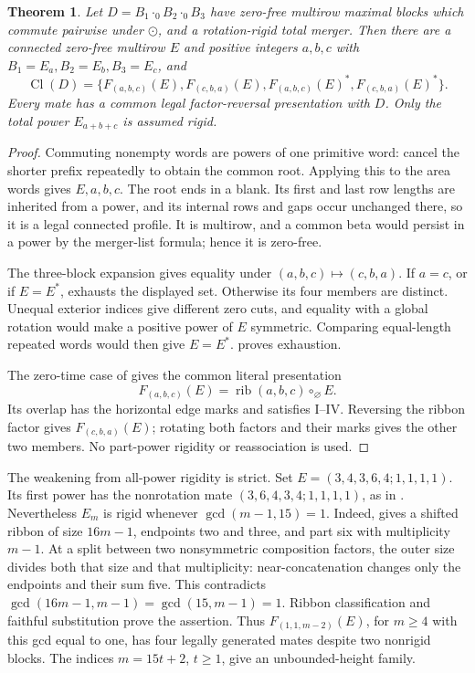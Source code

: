 \documentclass[11pt,a4paper]{amsart}
\numberwithin{equation}{section}
\theoremstyle{plain}
\newtheorem{theorem}{Theorem}[section]
\theoremstyle{definition}
\begin{document}
\begin{theorem}\label{thm:commuting-three-blocks}
Let \(D=B_1\cdot_0B_2\cdot_0B_3\) have zero-free multirow maximal blocks which commute pairwise under \(\odot\), and a rotation-rigid total merger.  Then there are a connected zero-free multirow \(E\) and positive integers \(a,b,c\) with \(B_1=E_a,B_2=E_b,B_3=E_c\), and
\begin{equation}\label{eq:commuting-three-class}
 \operatorname{Cl}(D)=
 \{F_{(a,b,c)}(E),F_{(c,b,a)}(E),F_{(a,b,c)}(E)^*,F_{(c,b,a)}(E)^*\}.
\end{equation}
Every mate has a common legal factor-reversal presentation with \(D\).  Only the total power \(E_{a+b+c}\) is assumed rigid.
\end{theorem}
\begin{proof}
Commuting nonempty words are powers of one primitive word: cancel the shorter prefix repeatedly to obtain the common root.  Applying this to the area words gives \(E,a,b,c\).  The root ends in a blank.  Its first and last row lengths are inherited from a power, and its internal rows and gaps occur unchanged there, so it is a legal connected profile.  It is multirow, and a common beta would persist in a power by the merger-list formula; hence it is zero-free.

The three-block expansion gives equality under \((a,b,c)\mapsto(c,b,a)\).  If \(a=c\), or if \(E=E^*\),  exhausts the displayed set.  Otherwise its four members are distinct.  Unequal exterior indices give different zero cuts, and equality with a global rotation would make a positive power of \(E\) symmetric.  Comparing equal-length repeated words would then give \(E=E^*\).   proves exhaustion.

The zero-time case of  gives the common literal presentation
\[
 F_{(a,b,c)}(E)=\operatorname{rib}(a,b,c)\circ_{\varnothing}E.
\]
Its overlap has the horizontal edge marks and satisfies I--IV.  Reversing the ribbon factor gives \(F_{(c,b,a)}(E)\); rotating both factors and their marks gives the other two members.  No part-power rigidity or reassociation is used.
\end{proof}

The weakening from all-power rigidity is strict.  Set \(E=(3,4,3,6,4;1,1,1,1)\).  Its first power has the nonrotation mate \((3,6,4,3,4;1,1,1,1)\), as in .  Nevertheless \(E_m\) is rigid whenever \(\gcd(m-1,15)=1\).  Indeed,  gives a shifted ribbon of size \(16m-1\), endpoints two and three, and part six with multiplicity \(m-1\).  At a split between two nonsymmetric composition factors, the outer size divides both that size and that multiplicity: near-concatenation changes only the endpoints and their sum five.  This contradicts \(\gcd(16m-1,m-1)=\gcd(15,m-1)=1\).  Ribbon classification and faithful substitution prove the assertion.  Thus \(F_{(1,1,m-2)}(E)\), for \(m\ge4\) with this gcd equal to one, has four legally generated mates despite two nonrigid blocks.  The indices \(m=15t+2\), \(t\ge1\), give an unbounded-height family.
\end{document}
